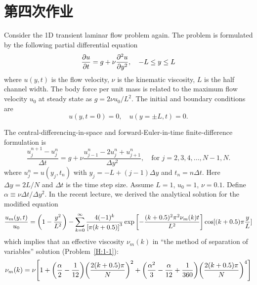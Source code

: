 \section{第四次作业}

\begin{homework}[label={H:4-1}]
    Consider the 1D transient laminar flow problem again. The problem is formulated by the following partial differential equation
    \begin{equation}\label{E:4-1-1}
        \pdv{u}{t} = g + \nu\pdv[2]{u}{y},
        \quad
        -L\leq y\leq L
    \end{equation}
    where $u(y, t)$ is the flow velocity, $\nu$ is the kinematic viscosity, $L$ is the half channel width. The body force per unit mass is related to the maximum flow velocity $u_0$ at steady state as $g=2\nu u_0/L^2$. The initial and boundary conditions are
    \begin{equation}\label{E:4-1-2}
        u(y, t=0)=0, \quad
        u(y=\pm L, t)=0.
    \end{equation}

    The central-differencing-in-space and forward-Euler-in-time finite-difference formulation is
    \begin{equation}\label{E:4-1-3}
        \frac{u_j^{n+1}-u_j^n}{\Delta t} = g + \nu\frac{u_{j-1}^n-2u_j^n+u_{j+1}^n}{\Delta y^2}, \quad
        \text{for } j=2, 3, 4, \ldots, N-1, N.
    \end{equation}
    where $u_j^n=u(y_j, t_n)$ with $y_j=-L+(j-1)\Delta y$ and $t_n=n\Delta t$. Here $\Delta y=2L/N$ and $\Delta t$ is the time step size. Assume $L=1$, $u_0=1$, $\nu=0.1$. Define $\alpha\equiv\nu\Delta t/\Delta y^2$. In the recent lecture, we derived the analytical solution for the modified equation
    \begin{equation}\label{E:4-1-4}
        \frac{u_m(y, t)}{u_0} = \qty(1-\frac{y^2}{L^2})
            - \sum_{k=0}^\infty\frac{4(-1)^k}{\qty[\pi(k+0.5)]^3}\exp\qty[
                -\frac{(k+0.5)^2\pi^2\nu_m(k)t}{L^2}
            ]\cos[
                (k+0.5)\pi\frac{y}{L}
            ]
    \end{equation}
    which implies that an effective viscosity $\nu_m(k)$ in ``the method of separation of variables'' solution (Problem~\ref{H:1-1}):
    \begin{equation}\label{E:4-1-5}
        \nu_m(k) = \nu\qty[
            1 + \qty(\frac{\alpha}{2}-\frac{1}{12})\qty(\frac{2(k+0.5)\pi}{N})^2
              + \qty(\frac{\alpha^2}{3}-\frac{\alpha}{12} + \frac{1}{360})\qty(\frac{2(k+0.5)\pi}{N})^4
        ]
    \end{equation}


\end{homework}
